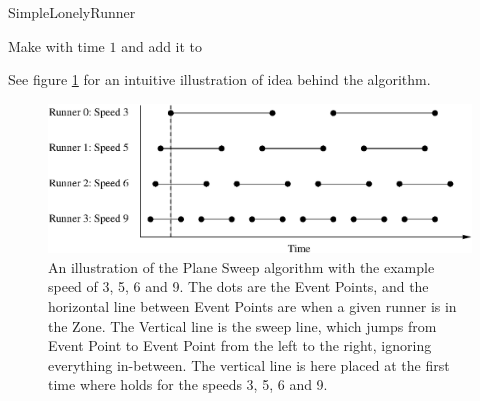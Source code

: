 \begin{algorithm}[H]
  \caption{SimpleLonelyRunner\label{simpleLonelyRunner}}
  \highlights
  
  Make \finish with time $1$ and add it to \li

  
\end{algorithm}

See figure \ref{algoIlluImg} for an intuitive illustration of idea behind the algorithm. 

\begin{figure}[H]
  \centering
  \includegraphics[width=\textwidth]{./images/algoIlluEPS}
  \caption{\label{algoIlluImg}An illustration of the Plane Sweep algorithm with the example speed of 3, 5, 6 and 9. The dots are the Event Points, and the horizontal line between Event Points are when a given runner is in the Zone. The Vertical line is the sweep line, which jumps from Event Point to Event Point from the left to the right, ignoring everything in-between. The vertical line is here placed at the first time where  holds for the speeds 3, 5, 6 and 9.}
\end{figure}

